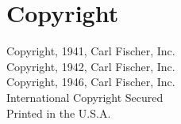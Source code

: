 \maketitle

\frontmatter

\chapter{Copyright}
\begin{center}
	Copyright, 1941, Carl Fischer, Inc. \\
	Copyright, 1942, Carl Fischer, Inc. \\
	Copyright, 1946, Carl Fischer, Inc. \\
	International Copyright Secured \\
	Printed in the U.S.A.
\end{center}
